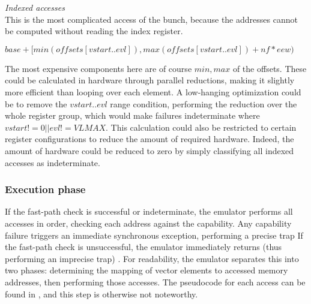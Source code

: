 
\noindent\emph{Indexed accesses}\\
\noindent This is the most complicated access of the bunch, because the addresses cannot be computed without reading the index register.

$base + [min(offsets[vstart..evl]), max(offsets[vstart..evl]) + nf * eew)$

The most expensive components here are of course $min,max$ of the offsets.
These could be calculated in hardware through parallel reductions, making it slightly more efficient than looping over each element.
A low-hanging optimization could be to remove the $vstart..evl$ range condition, performing the reduction over the whole register group, which would make failures indeterminate where $vstart != 0 || evl != VLMAX$.
This calculation could also be restricted to certain register configurations to reduce the amount of required hardware.
Indeed, the amount of hardware could be reduced to zero by simply classifying all indexed accesses as indeterminate.

\subsubsection{Execution phase}
If the fast-path check is successful or indeterminate, the emulator performs all accesses in order, checking each address against the capability.
Any capability failure triggers an immediate synchronous exception, performing a precise trap 
If the fast-path check is unsuccessful, the emulator immediately returns (thus performing an imprecise trap) .
For readability, the emulator separates this into two phases: determining the mapping of vector elements to accessed memory addresses, then performing those accesses.
The pseudocode for each access can be found in , and this step is otherwise not noteworthy.